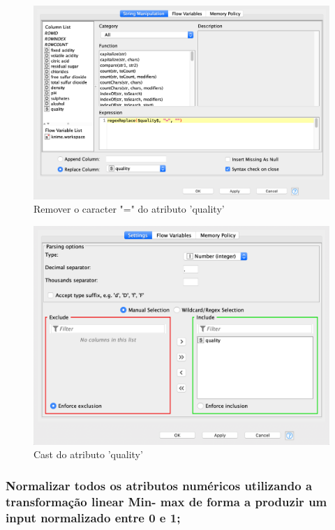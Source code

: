 \documentclass{article}
\begin{document}
\begin{figure}[H]
    \centering
    \includegraphics[scale=0.3]{Images/T2_a1.png}
    \caption{Remover o caracter "=" do atributo 'quality'}
\end{figure}

\begin{figure}[H]
    \centering
    \includegraphics[scale=0.3]{Images/T2_a2.png}
    \caption{Cast do atributo 'quality'}
\end{figure}

\subsubsection{Normalizar todos os atributos numéricos utilizando a transformação linear Min- max de forma a produzir um input normalizado entre 0 e 1;}
\end{document}
